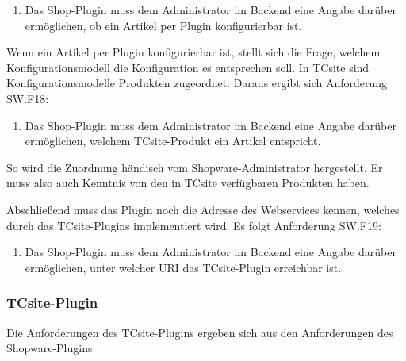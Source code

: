 \documentclass[11pt, a4paper, titlepage, listof=totoc, bibliography=totoc, index=totoc, twoside, openright, headings=normal]{scrreprt}
\begin{document}
\begin{enumerate}[SW.F17:]\bfseries
\item Das Shop-Plugin muss dem Administrator im Backend eine Angabe darüber ermöglichen, ob ein Artikel per Plugin konfigurierbar ist.
\end{enumerate}
Wenn ein Artikel per Plugin konfigurierbar ist, stellt sich die Frage, welchem Konfigurationsmodell die Konfiguration es entsprechen soll. In TCsite sind Konfigurationsmodelle Produkten zugeordnet. Daraus ergibt sich Anforderung SW.F18:
\begin{enumerate}[SW.F18:]\bfseries
\item Das Shop-Plugin muss dem Administrator im Backend eine Angabe darüber ermöglichen, welchem TCsite-Produkt ein Artikel entspricht.
\end{enumerate}
So wird die Zuordnung händisch vom Shopware-Administrator hergestellt. Er muss also auch Kenntnis von den in TCsite verfügbaren Produkten haben.

Abschließend muss das Plugin noch die Adresse des Webservices kennen, welches durch das TCsite-Plugins implementiert wird. Es folgt Anforderung SW.F19:
\begin{enumerate}[SW.F19:]\bfseries
\item Das Shop-Plugin muss dem Administrator im Backend eine Angabe darüber ermöglichen, unter welcher URI das TCsite-Plugin erreichbar ist.
\end{enumerate}

\subsubsection{TCsite-Plugin}
Die Anforderungen des TCsite-Plugins ergeben sich aus den Anforderungen des Shopware-Plugins.
\end{document}
